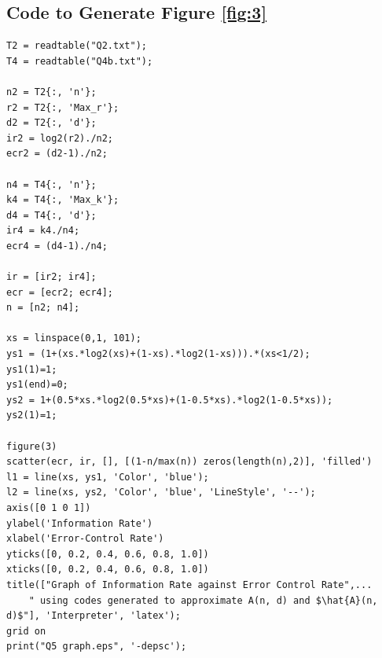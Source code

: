 \documentclass[11pt]{article} %
\begin{document}
\subsection*{Code to Generate Figure \ref{fig:3}}
\begin{lstlisting}
T2 = readtable("Q2.txt");
T4 = readtable("Q4b.txt");

n2 = T2{:, 'n'};
r2 = T2{:, 'Max_r'};
d2 = T2{:, 'd'};
ir2 = log2(r2)./n2;
ecr2 = (d2-1)./n2;

n4 = T4{:, 'n'};
k4 = T4{:, 'Max_k'};
d4 = T4{:, 'd'};
ir4 = k4./n4;
ecr4 = (d4-1)./n4;

ir = [ir2; ir4];
ecr = [ecr2; ecr4];
n = [n2; n4];

xs = linspace(0,1, 101);
ys1 = (1+(xs.*log2(xs)+(1-xs).*log2(1-xs))).*(xs<1/2);
ys1(1)=1;
ys1(end)=0;
ys2 = 1+(0.5*xs.*log2(0.5*xs)+(1-0.5*xs).*log2(1-0.5*xs));
ys2(1)=1;

figure(3)
scatter(ecr, ir, [], [(1-n/max(n)) zeros(length(n),2)], 'filled')
l1 = line(xs, ys1, 'Color', 'blue');
l2 = line(xs, ys2, 'Color', 'blue', 'LineStyle', '--');
axis([0 1 0 1])
ylabel('Information Rate') 
xlabel('Error-Control Rate')
yticks([0, 0.2, 0.4, 0.6, 0.8, 1.0])
xticks([0, 0.2, 0.4, 0.6, 0.8, 1.0])
title(["Graph of Information Rate against Error Control Rate",...
    " using codes generated to approximate A(n, d) and $\hat{A}(n, d)$"], 'Interpreter', 'latex');
grid on
print("Q5 graph.eps", '-depsc');
\end{lstlisting}
\end{document}
